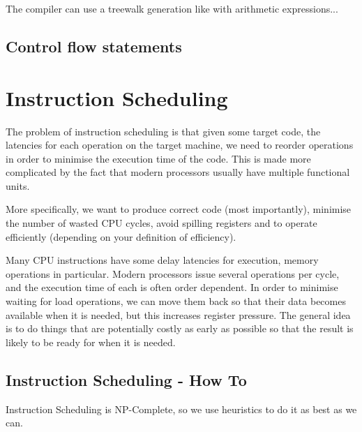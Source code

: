The compiler can use a treewalk generation like with arithmetic
expressions...


\subsection{Control flow statements}






\section{Instruction Scheduling}

The problem of instruction scheduling is that given some target code,
the latencies for each operation on the target machine, we need to
reorder operations in order to minimise the execution time of the
code. This is made more complicated by the fact that modern processors
usually have multiple functional units.

More specifically, we want to produce correct code (most importantly),
minimise the number of wasted CPU cycles, avoid spilling registers and
to operate efficiently (depending on your definition of efficiency).

Many CPU instructions have some delay latencies for execution, memory
operations in particular. Modern processors issue several operations
per cycle, and the execution time of each is often order dependent. In
order to minimise waiting for load operations, we can move them back
so that their data becomes available when it is needed, but this
increases register pressure. The general idea is to do things that are
potentially costly as early as possible so that the result is likely
to be ready for when it is needed.


\subsection{Instruction Scheduling - How To}

Instruction Scheduling is NP-Complete, so we use heuristics to do it as best as we can.

